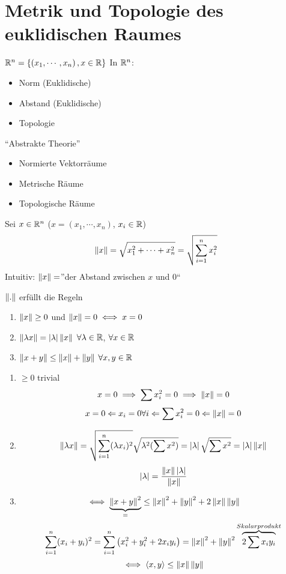 \section{Metrik und Topologie des euklidischen Raumes}
$\mathbb{R}^n=\left\{ \left( x_1,\cdots,x_n \right), x\in\mathbb{R} \right\}$
In $\mathbb{R}^n$:
\begin{itemize}
  \item Norm (Euklidische)
  \item Abstand (Euklidische)
  \item Topologie
\end{itemize}
``Abstrakte Theorie''
\begin{itemize}
  \item Normierte Vektorr\"aume
  \item Metrische R\"aume
  \item Topologische R\"aume
\end{itemize}
\begin{Def}
  Sei $x\in\mathbb{R}^n$ ($x=(x_1,\cdots,x_n)$, $x_i\in\mathbb{R}$)
  \[\left\| x \right\|=\sqrt{x_1^2+\cdots+x_n^2}=\sqrt{\sum_{i=1}^nx_i^2}\]
  Intuitiv: $\left\| x \right\|=$''der Abstand zwischen $x$ und 0``
\end{Def}
\begin{Lem}
  $\left\| . \right\|$ erf\"ullt die Regeln
  \begin{enumerate}
    \item $\left\| x \right\|\geq 0$ und $\left\| x \right\|=0\iff x=0$
    \item $\left\| \lambda x \right\|=\left| \lambda \right|\left\| x \right\|$ $\forall \lambda\in\mathbb{R}$, $\forall x\in\mathbb{R}$
    \item $\left\| x+y \right\|\leq\left\| x \right\|+\left\| y \right\|$ $\forall x,y\in\mathbb{R}$
  \end{enumerate}
\end{Lem}
\begin{Bew}
  \begin{enumerate}
    \item $\geq 0$ trivial
      \[x=0\implies \sum x_i^2=0\implies \left\| x \right\|=0\]
      \[x=0\Leftarrow x_i=0 \forall i\Leftarrow \sum x_i^2=0\Leftarrow \left\| x \right\|=0\]
    \item \[\left\| \lambda x \right\|=\sqrt{\sum^n_{i=1}(\lambda x_i)^2}\sqrt{\lambda^2(\sum x^2)}=\left| \lambda \right|\sqrt{\sum x^2}=\left| \lambda \right|\left\| x \right\|\]
      \[\left| \lambda \right|=\frac{\left\| x \right\|\left| \lambda \right|}{\left\| x \right\|}\]
    \item
      \[\iff \underbrace{\left\| x+y \right\|^2}_=\leq \left\| x \right\|^2+\left\| y \right\|^2+2\left\| x \right\|\left\| y \right\|\]
      \[\sum_{i=1}^n(x_i+y_i)^2=\sum_{i=1}^n\left( x_i^2+y_i^2+2x_iy_i \right)=\left\| x \right\|^2+\left\| y \right\|^2\overbrace{2\sum x_iy_i}^{Skalarprodukt}\]
      \[\iff \left< x,y\right>\leq \left\| x \right\|\left\| y \right\|\]
  \end{enumerate}
\end{Bew}
